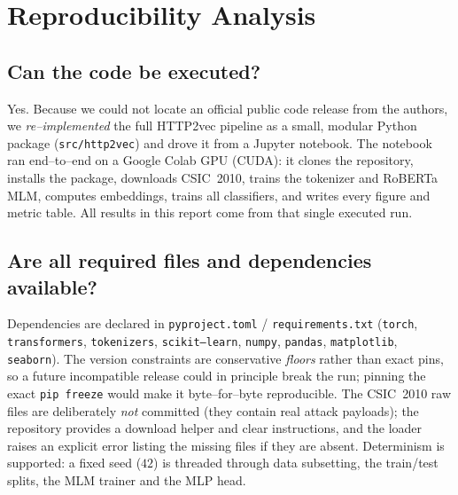 \documentclass[11pt,a4paper]{article}
\begin{document}
\section{Reproducibility Analysis}
\label{sec:repro}

\subsection{Can the code be executed?}
Yes. Because we could not locate an official public code release from the authors, we
\emph{re--implemented} the full HTTP2vec pipeline as a small, modular Python package
(\texttt{src/http2vec}) and drove it from a Jupyter notebook. The notebook ran
end--to--end on a Google Colab GPU (CUDA): it clones the repository, installs the package,
downloads CSIC~2010, trains the tokenizer and RoBERTa MLM, computes embeddings, trains all
classifiers, and writes every figure and metric table. All results in this report come
from that single executed run.

\subsection{Are all required files and dependencies available?}
Dependencies are declared in \texttt{pyproject.toml} / \texttt{requirements.txt}
(\texttt{torch}, \texttt{transformers}, \texttt{tokenizers}, \texttt{scikit--learn},
\texttt{numpy}, \texttt{pandas}, \texttt{matplotlib}, \texttt{seaborn}). The version
constraints are conservative \emph{floors} rather than exact pins, so a future
incompatible release could in principle break the run; pinning the exact
\texttt{pip freeze} would make it byte--for--byte reproducible. The CSIC~2010 raw files are
deliberately \emph{not} committed (they contain real attack payloads); the repository
provides a download helper and clear instructions, and the loader raises an explicit error
listing the missing files if they are absent. Determinism is supported: a fixed seed
($42$) is threaded through data subsetting, the train/test splits, the MLM trainer and the
MLP head.
\end{document}
